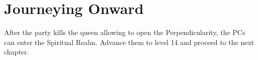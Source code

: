 
\newpage


\newpage



\section{Journeying Onward}

After the party kills the queen allowing \npcSjaAnat{} to open the Perpendicularity, the PCs can enter the Spiritual Realm. Advance them to level 14 and proceed to the next chapter.